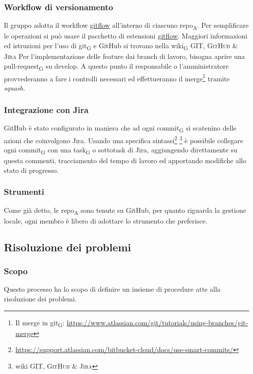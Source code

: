     \subsubsection{Workflow di versionamento}
        Il gruppo adotta il workflow \href{https://www.atlassian.com/git/tutorials/comparing-workflows/gitflow-workflow}{gitflow} all'interno di ciascuno repo\textsubscript{A}. Per semplificare le operazioni si può usare il pacchetto di estensioni \href{http://danielkummer.github.io/git-flow-cheatsheet/}{gitflow}. Maggiori informazioni ed istruzioni per l'uso di git\textsubscript{G} e GitHub si trovano nella wiki\textsubscript{G} \textsc{GIT, GitHub \& Jira}
            Per l'implementazione delle feature dai branch di lavoro, bisogna aprire una pull-request\textsubscript{G} su develop. A questo punto il responsabile o l'amministratore provvederanno a fare i controlli necessari ed effettueranno il merge\footnote{Il merge in git\textsubscript{G}: \url{https://www.atlassian.com/git/tutorials/using-branches/git-merge}} tramite \textit{squash}.

    \subsubsection{Integrazione con Jira}
    \label{jiraintegration}
        GitHub è stato configurato in maniera che ad ogni commit\textsubscript{G} si scatenino delle azioni che coinvolgono Jira. Usando una specifica sintassi\footnote{\url{https://support.atlassian.com/bitbucket-cloud/docs/use-smart-commits/}} \footnote{wiki \textsc{GIT, GitHub \& Jira}} è possibile collegare ogni commit\textsubscript{G} con una task\textsubscript{G} o sottotask di Jira, aggiungendo direttamente su questa commenti, tracciamento del tempo di lavoro ed apportando modifiche allo stato di progresso.

    \subsubsection{Strumenti}
    Come già detto, le repo\textsubscript{A} sono tenute su GitHub, per quanto riguarda la gestione locale, ogni membro è libero di adottare lo strumento che preferisce.


\subsection{Risoluzione dei problemi}
    \label{risoluzioneproblemi}
    \subsubsection{Scopo}
        Questo processo ha lo scopo di definire un insieme di procedure atte alla risoluzione dei problemi.
